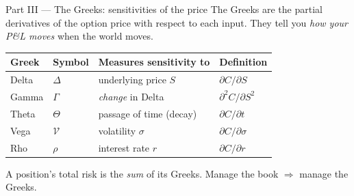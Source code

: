 \documentclass[11pt,aspectratio=169]{beamer}
\newcommand{\call}{C}
\newcommand{\und}{S}                         %
\newcommand{\keybox}[1]{%
  \begin{beamercolorbox}[wd=\textwidth,sep=0.6em,rounded=true]{}%
    \colorbox{soft}{\parbox{\dimexpr\textwidth-1.4em}{\color{ink}#1}}%
  \end{beamercolorbox}}
\begin{document}
\begin{frame}{Part III — The Greeks: sensitivities of the price}
  The \alert{Greeks} are the partial derivatives of the option price with
  respect to each input. They tell you \emph{how your P\&L moves} when the
  world moves.
  \vspace{0.4em}
  \begin{center}\small
  \begin{tabular}{@{}l l l l@{}}
    \toprule
    \textbf{Greek} & \textbf{Symbol} & \textbf{Measures sensitivity to} & \textbf{Definition}\\
    \midrule
    Delta & $\Delta$ & underlying price $\und$      & $\partial \call/\partial \und$\\
    Gamma & $\Gamma$ & \emph{change} in Delta        & $\partial^2 \call/\partial \und^2$\\
    Theta & $\Theta$ & passage of time (decay)       & $\partial \call/\partial t$\\
    Vega  & $\mathcal{V}$ & volatility $\sigma$       & $\partial \call/\partial \sigma$\\
    Rho   & $\rho$   & interest rate $r$             & $\partial \call/\partial r$\\
    \bottomrule
  \end{tabular}
  \end{center}
  \vspace{0.3em}
  \keybox{A position's total risk is the \emph{sum} of its Greeks. Manage the book $\Rightarrow$ manage the Greeks.}
\end{frame}
\end{document}
